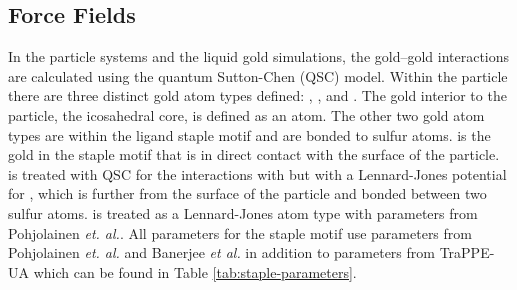 \subsection{Force Fields}
In the particle systems and the liquid gold simulations, the gold--gold interactions are calculated using the quantum Sutton-Chen (QSC) model.\cite{Qi:1999ph}
Within the  particle there are three distinct gold atom types defined: , , and . 
The gold interior to the particle, the icosahedral core, is defined as an  atom.
The other two gold atom types are within the ligand staple motif and are bonded to sulfur atoms.
 is the gold in the staple motif that is in direct contact with the surface of the particle. 
 is treated with QSC for the interactions with  but with a Lennard-Jones potential for , which is further from the surface of the particle and bonded between two sulfur atoms.
 is treated as a Lennard-Jones atom type with parameters from Pohjolainen \textit{et. al.}.\cite{Pohjolainen2016}
All parameters for the staple motif use parameters from Pohjolainen \textit{et. al.}\cite{Pohjolainen2016} and Banerjee \textit{et al.}\cite{Banerjee2012} in addition to parameters from TraPPE-UA\cite{TraPPE-UA.alkanes,TraPPE-UA.alkylbenzenes} which can be found in Table \ref{tab:staple-parameters}.

